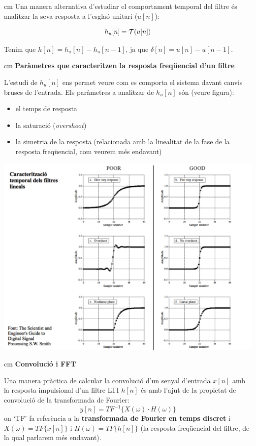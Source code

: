 \documentclass{article}
\begin{document}
 cm
Una manera alternativa d'estudiar el comportament temporal del filtre és analitzar la seva resposta a l'esglaó unitari ($u[n]$):

\[
h_u[n]={\cal T}(u[n])
\]

Tenim que $h[n]=h_u[n]-h_u[n-1]$, ja que $\delta [n]=u[n]-u[n-1]$.

 cm
\textbf{Paràmetres que caracteritzen la resposta freqüencial d'un filtre}

L'estudi de $h_u[n]$ ens permet veure com es comporta el sistema davant canvis bruscs de l'entrada. Els paràmetres a analitzar de $h_u[n]$ 
són (veure figura): 
\begin{itemize}
\item el temps de resposta
\item la saturació (\textit{overshoot})
\item la simetria de la resposta (relacionada amb la linealitat de la fase de la resposta freqüencial, com veurem més endavant)
\end{itemize}

\includegraphics[width=15cm]{cartempfiltres.png}

 cm
\textbf{Convolució i FFT}

Una manera pràctica de calcular la convolució d'un senyal d'entrada $x[n]$ amb la resposta impulsional d'un filtre LTI $h[n]$ és amb
l'ajut de la propietat de convolució de la transformada de Fourier:
\[
y[n]= TF^{-1} \{ X(\omega) \cdot H(\omega) \}
\]
on `TF' fa referència a la \textbf{transformada de Fourier en temps discret} i $X(\omega)=TF \{ x[n] \}$ i
$H(\omega)=TF \{ h[n] \}$ (la resposta freqüencial del filtre, de la qual parlarem més endavant).
\end{document}

